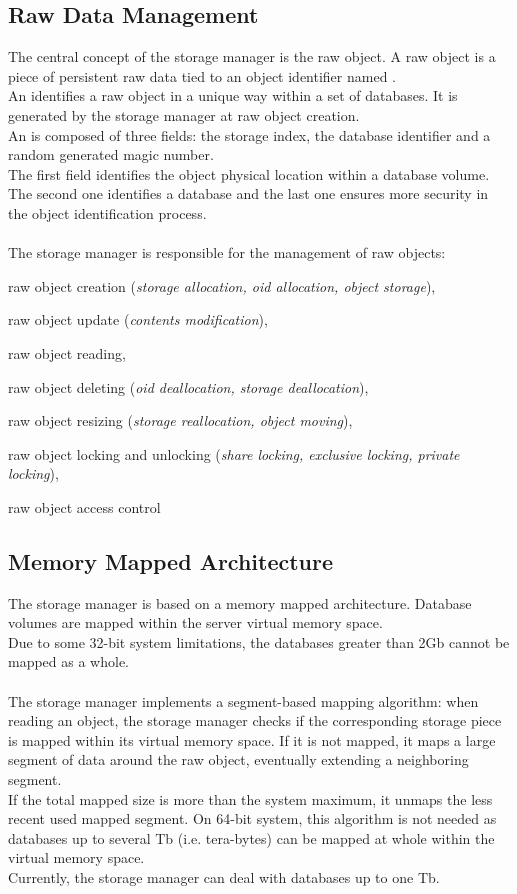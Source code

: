 \subsection{Raw Data Management}
The central concept of the storage manager is the raw object.
A raw object is a piece of persistent raw data tied to an object identifier
named \oid.
\\
An \oid identifies a raw object in a unique way within a set of databases.
It is
generated by the storage manager at raw object creation.
\\
An \oid is composed of three fields: the storage index, the database identifier
and a random generated magic number.
\\
The first field identifies the object physical location
within a database volume.
The second one identifies a database and the last one ensures more
security in the object identification process.
\\
\\
The storage manager is responsible for the management of raw objects:
\bi
\item raw object creation (\emph{storage allocation, oid allocation,
 object storage}),
\item raw object update (\emph{contents modification}),
\item raw object reading,
\item raw object deleting (\emph{oid deallocation,  storage deallocation}),
\item raw object resizing (\emph{storage reallocation, 
object moving}),
\item raw object locking and unlocking (\emph{share locking, exclusive locking, private locking}),
\item raw object access control
\ei

\subsection{Memory Mapped Architecture}
The storage manager is based on a memory mapped architecture. Database
volumes are mapped within the server virtual memory space.
\\
Due to some 32-bit system limitations, the databases greater than 2Gb cannot
be mapped as a whole.
\\
\\
The storage manager implements a segment-based mapping algorithm:
when reading an object, the storage manager checks if the
corresponding storage piece is mapped within its virtual memory space. If it is
not mapped, it maps a large segment of data around the raw object,
eventually extending a neighboring segment.
\\
If the total mapped size is more than the system maximum, it
unmaps the less recent used mapped segment.
On 64-bit system, this algorithm is not needed as databases up to
several Tb (i.e. tera-bytes) can be mapped at whole within the virtual
 memory space.
\\
Currently, the storage manager can deal with databases up to one
Tb.
